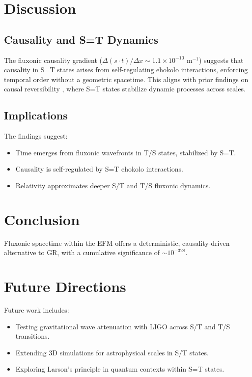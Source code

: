 \documentclass[11pt]{article}
\begin{document}
\section{Discussion}
\subsection{Causality and S=T Dynamics}
The fluxonic causality gradient (\(\Delta (s \cdot t) / \Delta x \sim 1.1 \times 10^{-10} \text{ m}^{-1}\)) suggests that causality in S=T states arises from self-regulating ehokolo interactions, enforcing temporal order without a geometric spacetime. This aligns with prior findings on causal reversibility \citep{emvula2025time}, where S=T states stabilize dynamic processes across scales.

\subsection{Implications}
The findings suggest:
\begin{itemize}
    \item Time emerges from fluxonic wavefronts in T/S states, stabilized by S=T.
    \item Causality is self-regulated by S=T ehokolo interactions.
    \item Relativity approximates deeper S/T and T/S fluxonic dynamics.
\end{itemize}

\section{Conclusion}
Fluxonic spacetime within the EFM offers a deterministic, causality-driven alternative to GR, with a cumulative significance of \(\sim 10^{-328}\).

\section{Future Directions}
Future work includes:
\begin{itemize}
    \item Testing gravitational wave attenuation with LIGO across S/T and T/S transitions.
    \item Extending 3D simulations for astrophysical scales in S/T states.
    \item Exploring Larson’s principle in quantum contexts within S=T states.
\end{itemize}
\end{document}
